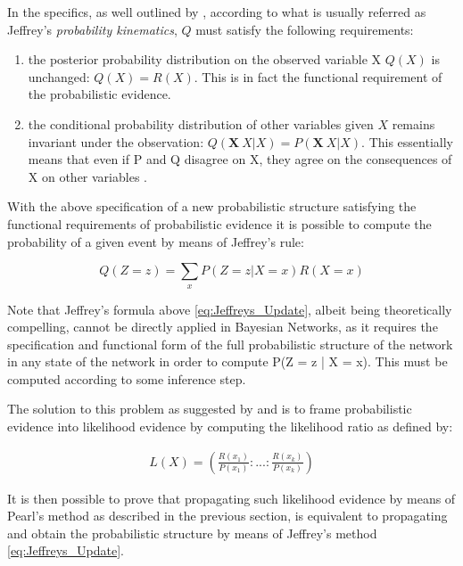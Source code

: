 \documentclass[11pt]{article}
\begin{document}
\begin{article}
In the specifics, as well outlined by \cite{Mrad_2015}, according to
what is usually referred as Jeffrey's \emph{probability kinematics}, \(Q\)
must satisfy the following requirements:

\begin{enumerate}
\item the posterior probability distribution on the observed variable X
\(Q(X)\) is unchanged: \(Q(X) = R(X)\). This is in fact the
functional requirement of the probabilistic evidence.

\item the conditional probability distribution of other variables given
\(X\) remains invariant under the observation: \(Q(\textbf{X} \
     {X} | X) = P (\textbf{X} \ {X} | X)\). This essentially means that
even if P and Q disagree on X, they agree on the consequences of
X on other variables \cite{Mrad_2015}.
\end{enumerate}

With the above specification of a new probabilistic structure
satisfying the functional requirements of probabilistic evidence it
is possible to compute the probability of a given event by means of
Jeffrey's rule:

\begin{equation} \label{eq:Jeffreys_Update}
 Q(Z = z) = \sum_x P(Z = z | X = x) R(X = x)
\end{equation}

Note that Jeffrey's formula above \ref{eq:Jeffreys_Update}, albeit
being theoretically compelling, cannot be directly applied in
Bayesian Networks, as it requires the specification and functional
form of the full probabilistic structure of the network in any state
of the network in order to compute P(Z = z | X = x). This must be
computed according to some inference step.

The solution to this problem as suggested by \cite{Chan_2005} and
\cite{PENG_2010} is to frame probabilistic evidence into likelihood
evidence by computing the likelihood ratio as defined by:

\begin{align} \label{eq:probabilistic-to-likelihood-evidence}
 L(X) = (\frac{R(x_1)}{P(x_1)}: ... : \frac{R(x_k)}{P(x_k)})
\end{align}

It is then possible to prove that propagating such likelihood
evidence by means of Pearl's method as described in the previous
section, is equivalent to propagating and obtain the probabilistic
structure by means of Jeffrey's method \ref{eq:Jeffreys_Update}.


\end{article}
\end{document}
